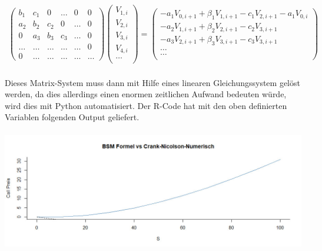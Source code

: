 \documentclass[12pt,titlepage]{article}
\begin{document}
\begin{align*}
\begin{pmatrix}
b_1 & c_1 & 0 & \ldots & 0 & 0\\
a_2 & b_2 & c_2 & 0 & \ldots & 0\\
0   & a_3 & b_3 & c_3 & \ldots & 0\\
\ldots & \ldots & \ldots & \ldots& \ldots & 0\\
0 & \ldots & \ldots & \ldots & \ldots & \ldots
\end{pmatrix} \begin{pmatrix}
V_{1,i}\\
V_{2,i}\\
V_{3,i}\\
V_{4,i}\\
\ldots\\
\end{pmatrix} = \begin{pmatrix}
-a_1 V_{0,i+1}+\beta_1 V_{1,i+1}-c_1V_{2,i+1}-a_1V_{0,i}\\
-a_2 V_{1,i+1}+\beta_2 V_{2,i+1}-c_2V_{3,i+1}\\
-a_3 V_{2,i+1}+\beta_3 V_{3,i+1}-c_3V_{3,i+1}\\
\ldots\\
\ldots\\
\end{pmatrix}
\end{align*}
\\
Dieses Matrix-System muss dann mit Hilfe eines linearen Gleichungssystem gelöst werden, da dies allerdings einen enormen zeitlichen Aufwand bedeuten würde, wird dies mit Python automatisiert. Der R-Code hat mit den oben definierten Variablen folgenden Output geliefert.\\\\
\includegraphics[width=15.3cm]{crank.png}
\\\\
\end{document}

